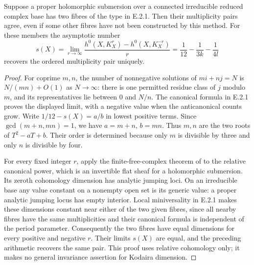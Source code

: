 \begin{proposition}
Suppose a proper holomorphic submersion over a connected
irreducible reduced complex base has two fibres of the type
in E.2.1.  Then their multiplicity pairs agree, even if some
other fibres have not been constructed by this method.
For these members the asymptotic number
\[
 s(X)=\lim_{r\to\infty}
 \frac{h^0(X,K_X^r)-h^0(X,K_X^{-r})}{r}
 =\frac1{12}-\frac1{3k}-\frac1{4l}
\]
recovers the ordered multiplicity pair uniquely.
\end{proposition}
\begin{proof}
For coprime $m,n$, the number of nonnegative solutions of
$mi+nj=N$ is $N/(mn)+O(1)$ as $N\to\infty$:
there is one permitted residue class of $j$ modulo $m$, and
its representatives lie between $0$ and $N/n$.
The canonical formula in E.2.1 proves the displayed limit,
with a negative value when the anticanonical counts grow.
Write $1/12-s(X)=a/b$ in lowest positive terms.
Since $\gcd(m+n,mn)=1$, we have $a=m+n$, $b=mn$.
Thus $m,n$ are the two roots of $T^2-aT+b$.
Their order is determined because only $m$ is divisible by
three and only $n$ is divisible by four.

For every fixed integer $r$, apply the finite-free-complex
theorem of \cite[Chapter III, Theorem 4.1]{BS76push} to
the relative canonical power, which is an invertible flat
sheaf for a holomorphic submersion.  Its zeroth cohomology
dimension has analytic jumping loci.  On an irreducible
base any value constant on a nonempty open set is its
generic value: a proper analytic jumping locus has empty
interior.  Local miniversality in E.2.1 makes these dimensions
constant near either of the two given fibres, since all
nearby fibres have the same multiplicities and their
canonical formula is independent of the period parameter.
Consequently the two fibres have equal dimensions for
every positive and negative $r$.  Their limits $s(X)$
are equal, and the preceding arithmetic recovers the same
pair.  This proof uses relative cohomology only; it makes
no general invariance assertion for Kodaira dimension.
\end{proof}

